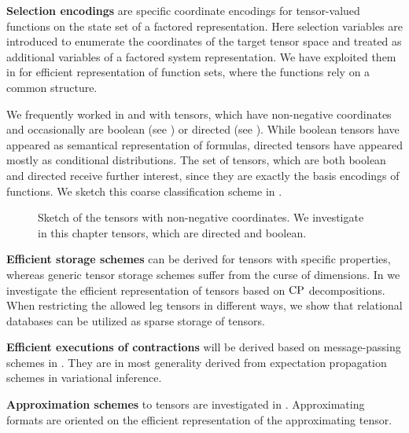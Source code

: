 \textbf{Selection encodings} are specific coordinate encodings for tensor-valued functions on the state set of a factored representation.
Here selection variables are introduced to enumerate the coordinates of the target tensor space and treated as additional variables of a factored system representation.
We have exploited them in  for efficient representation of function sets, where the functions rely on a common structure.


We frequently worked in  and  with tensors, which have non-negative coordinates and occasionally are boolean (see ) or directed (see ).
While boolean tensors have appeared as semantical representation of formulas, directed tensors have appeared mostly as conditional distributions.
The set of tensors, which are both boolean and directed receive further interest, since they are exactly the basis encodings of functions.
We sketch this coarse classification scheme in .
\begin{figure}[h]
    \begin{center}
        
    \end{center}
    \caption{Sketch of the tensors with non-negative coordinates.
    We investigate in this chapter tensors, which are directed and boolean.}\label{fig:dbTensorSketch}
\end{figure}


\textbf{Efficient storage schemes} can be derived for tensors with specific properties, whereas generic tensor storage schemes suffer from the curse of dimensions.
In  we investigate the efficient representation of tensors based on $\mathrm{CP}$ decompositions.
When restricting the allowed leg tensors in different ways, we show that relational databases can be utilized as sparse storage of tensors.

\textbf{Efficient executions of contractions} will be derived based on message-passing schemes in .
They are in most generality derived from expectation propagation schemes in variational inference.

\textbf{Approximation schemes} to tensors are investigated in .
Approximating formats are oriented on the efficient representation of the approximating tensor.